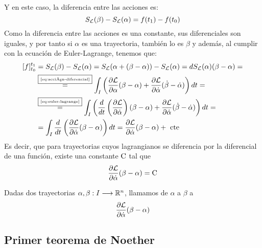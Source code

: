 Y en este caso, la diferencia entre las acciones es:
\begin{equation}
	\label{eq:variación-acción-relación}
	S_{\mathcal{L}}(\beta) - S_{\mathcal{L}}(\alpha) = f(t_1) - f(t_0)
\end{equation}
Como la diferencia entre las acciones es una constante, sus diferenciales son iguales, y por tanto si $\alpha$ es una trayectoria, también lo es $\beta$ y además, al cumplir con la ecuación de Euler-Lagrange, tenemos que:
\begin{equation}
	\label{eq:diferencial_trayectoria}
	\begin{split}
	[f]_{t_0}^{t_1} & = S_{\mathcal{L}}(\beta) - S_{\mathcal{L}}(\alpha) = S_{\mathcal{L}}(\alpha + (\beta-\alpha))-S_{\mathcal{L}}(\alpha)=dS_{\mathcal{L}}(\alpha)(\beta-\alpha)=\\
	&\overset{\fbox{\tiny \ref{eq:acción-diferencial}}}{=} \int_{I}\left( \frac{\partial \mathcal{L}}{\partial\alpha}(\beta-\alpha)+\frac{\partial \mathcal{L}}{\partial\dot{\alpha}}(\dot{\beta}-\dot{\alpha})\right) dt = \\
	&\overset{\fbox{\tiny \ref{eq:euler-lagrange}}}{=} \int_{I}\left( \frac{d}{dt}\left(\frac{\partial \mathcal{L}}{\partial\dot{\alpha}}\right)(\beta-\alpha)+\frac{\partial \mathcal{L}}{\partial\dot{\alpha}}(\dot{\beta}-\dot{\alpha})\right) dt=\\
	&= \int_{I}\frac{d}{dt}\left(\frac{\partial \mathcal{L}}{\partial\dot{\alpha}}(\beta-\alpha)\right) dt = \frac{\partial \mathcal{L}}{\partial\dot{\alpha}}(\beta-\alpha) + \text{ cte }
	\end{split}
\end{equation}
Es decir, que para trayectorias cuyos lagrangianos se diferencia por la diferencial de una función, existe una constante $\text{\rmfamily\upshape C}$ tal que
\begin{equation}
	\label{eq:carga_noether_para_trayectorias}
	\frac{\partial \mathcal{L}}{\partial\dot{\alpha}}(\beta-\alpha) = \text{\rmfamily\upshape C}
\end{equation}

\begin{definition}
	Dadas dos trayectorias $\alpha,\beta:I\longrightarrow \mathbb{R}^n$, llamamos  de $\alpha$ a $\beta$ a
	\begin{equation}
		\label{eq:carga_noether}
		\frac{\partial \mathcal{L}}{\partial\dot{\alpha}}(\beta-\alpha)
	\end{equation}
\end{definition}

\subsection{Primer teorema de Noether}\label{subsec:primer-teorema-de-noether}

